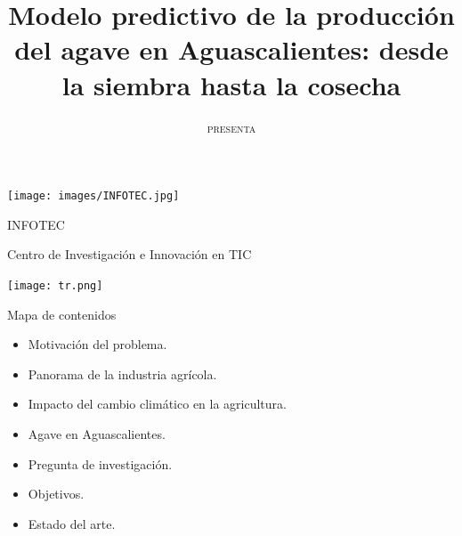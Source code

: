 \documentclass[aspectratio=169]{beamer}
\title[]{\Large\centering
\color{airforceblue}Modelo predictivo de la producción del agave en Aguascalientes: desde la siembra hasta la cosecha}
\author{{\small \textsc{presenta}}\centering{\\Isaac Vázquez Mendoza \\ {\small\textsc{
		bajo la dirección de}}\\ Dra. Magali Arellano Vázquez}}
\institute{}
\begin{document}
	\begin{frame}[noframenumbering]
		
		\begin{minipage}{0.15\textwidth}
			\centering
			\hspace{0.3cm}\vspace{-0.6cm}\texttt{[image: images/INFOTEC.jpg]}
		\end{minipage}%
		\begin{minipage}{0.65\textwidth}
			\centering \vspace{0.5cm}
			\hspace{1cm}INFOTEC
			
			\hspace{1cm}Centro de Investigación e Innovación en TIC
                \hspace{1cm}
   
		\end{minipage}%
		\begin{minipage}{0.2\textwidth}
			\texttt{[image: tr.png]}
                \hspace*{0.5cm}%
		\end{minipage}
		\date{}
		\titlepage
		
		
		
	\end{frame}
%
%


%
%



{
	\begin{frame}{Mapa de contenidos}
		\begin{itemize}
			\color{airforceblue}
			\item Motivación del problema.
			\item Panorama de la industria agrícola.
			\item Impacto del cambio climático en la agricultura.
			\item Agave en Aguascalientes.
			\item Pregunta de investigación.
			\item Objetivos.
			\item Estado del arte.
		\end{itemize}
	\end{frame}
}
\end{document}

